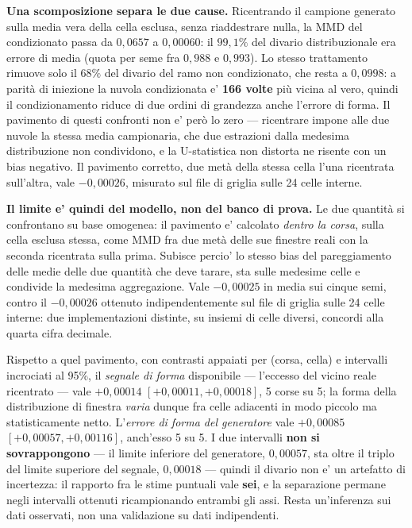 \documentclass[10pt,conference,a4paper,twocolumn]{IEEEtran}
\begin{document}
\textbf{Una scomposizione separa le due cause.} Ricentrando il campione generato sulla media vera della cella esclusa, senza riaddestrare nulla, la MMD del condizionato passa da $0{,}0657$ a $0{,}00060$: il \textbf{$99{,}1\%$} del divario distribuzionale era errore di media (quota per seme fra $0{,}988$ e $0{,}993$). Lo stesso trattamento rimuove solo il $68\%$ del divario del ramo non condizionato, che resta a $0{,}0998$: a parità di iniezione la nuvola condizionata e' \textbf{166 volte} più vicina al vero, quindi il condizionamento riduce di due ordini di grandezza anche l'errore di forma. Il pavimento di questi confronti non e' però lo zero — ricentrare impone alle due nuvole la stessa media campionaria, che due estrazioni dalla medesima distribuzione non condividono, e la U-statistica non distorta ne risente con un bias negativo. Il pavimento corretto, due metà della stessa cella l'una ricentrata sull'altra, vale $-0{,}00026$, misurato sul file di griglia sulle 24 celle interne.

\textbf{Il limite e' quindi del modello, non del banco di prova.} Le due quantità si confrontano su base omogenea: il pavimento e' calcolato \emph{dentro la corsa}, sulla cella esclusa stessa, come MMD fra due metà delle sue finestre reali con la seconda ricentrata sulla prima. Subisce percio' lo stesso bias del pareggiamento delle medie delle due quantità che deve tarare, sta sulle medesime celle e condivide la medesima aggregazione. Vale $-0{,}00025$ in media sui cinque semi, contro il $-0{,}00026$ ottenuto indipendentemente sul file di griglia sulle 24 celle interne: due implementazioni distinte, su insiemi di celle diversi, concordi alla quarta cifra decimale.

Rispetto a quel pavimento, con contrasti appaiati per (corsa, cella) e intervalli incrociati al 95\%, il \emph{segnale di forma} disponibile — l'eccesso del vicino reale ricentrato — vale $+0{,}00014$ $[+0{,}00011, +0{,}00018]$, 5 corse su 5; la forma della distribuzione di finestra \emph{varia} dunque fra celle adiacenti in modo piccolo ma statisticamente netto. L'\emph{errore di forma del generatore} vale $+0{,}00085$ $[+0{,}00057, +0{,}00116]$, anch'esso 5 su 5. I due intervalli \textbf{non si sovrappongono} — il limite inferiore del generatore, $0{,}00057$, sta oltre il triplo del limite superiore del segnale, $0{,}00018$ — quindi il divario non e' un artefatto di incertezza: il rapporto fra le stime puntuali vale \textbf{sei}, e la separazione permane negli intervalli ottenuti ricampionando entrambi gli assi. Resta un'inferenza sui dati osservati, non una validazione su dati indipendenti.
\end{document}
